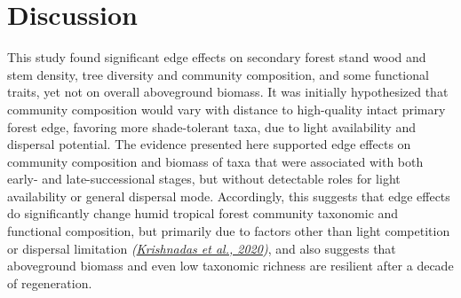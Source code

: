 \documentclass[
  12pt,
]{article}
\begin{document}
\hypertarget{discussion}{%
\section{Discussion}\label{discussion}}

This study found significant edge effects on secondary forest stand wood and stem density, tree diversity and community composition, and some functional traits, yet not on overall aboveground biomass.
It was initially hypothesized that community composition would vary with distance to high-quality intact primary forest edge, favoring more shade-tolerant taxa, due to light availability and dispersal potential.
The evidence presented here supported edge effects on community composition and biomass of taxa that were associated with both early- and late-successional stages, but without detectable roles for light availability or general dispersal mode.
Accordingly, this suggests that edge effects do significantly change humid tropical forest community taxonomic and functional composition, but primarily due to factors other than light competition or dispersal limitation \emph{(\protect\hyperlink{ref-krishnadas20}{Krishnadas et al., 2020})}, and also suggests that aboveground biomass and even low taxonomic richness are resilient after a decade of regeneration.
\end{document}

